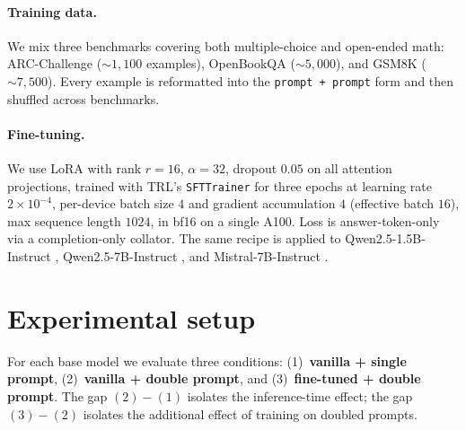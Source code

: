 \documentclass{article}
\begin{document}
\paragraph{Training data.} We mix three benchmarks covering both
multiple-choice and open-ended math: ARC-Challenge
\citep{clark2018arc} ($\sim 1{,}100$ examples), OpenBookQA
\citep{mihaylov2018openbookqa} ($\sim 5{,}000$), and GSM8K
\citep{cobbe2021gsm8k} ($\sim 7{,}500$). Every example is reformatted
into the \texttt{prompt + prompt} form and then shuffled across
benchmarks.

\paragraph{Fine-tuning.} We use LoRA with rank $r{=}16$, $\alpha{=}32$,
dropout $0.05$ on all attention projections, trained with TRL's
\texttt{SFTTrainer} for three epochs at learning rate $2\times 10^{-4}$,
per-device batch size $4$ and gradient accumulation $4$ (effective
batch $16$), max sequence length $1024$, in bf16 on a single A100.
Loss is answer-token-only via a completion-only collator. The same
recipe is applied to Qwen2.5-1.5B-Instruct \citep{qwen25},
Qwen2.5-7B-Instruct \citep{qwen25}, and Mistral-7B-Instruct
\citep{jiang2023mistral}.


\section{Experimental setup}

For each base model we evaluate three conditions: (1)~\textbf{vanilla
+ single prompt}, (2)~\textbf{vanilla + double prompt}, and
(3)~\textbf{fine-tuned + double prompt}. The gap $(2)-(1)$ isolates the
inference-time effect; the gap $(3)-(2)$ isolates the additional effect
of training on doubled prompts.
\end{document}
